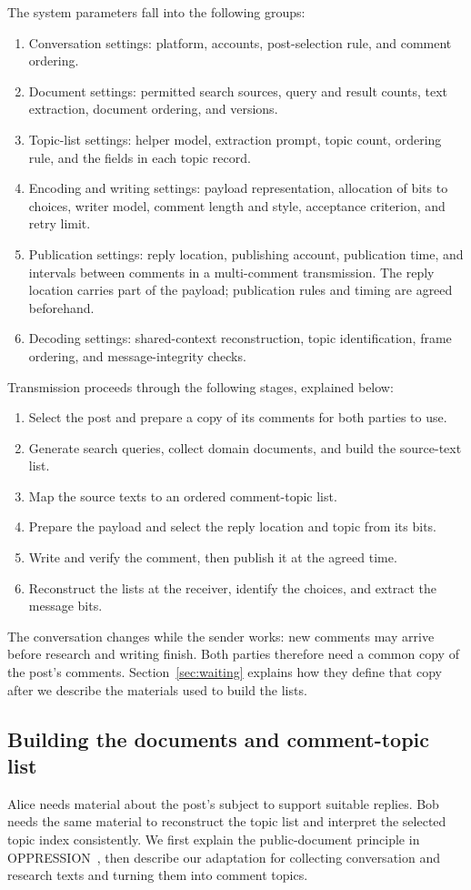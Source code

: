 The system parameters fall into the following groups:
\begin{enumerate}
\item Conversation settings: platform, accounts, post-selection rule, and comment ordering.
\item Document settings: permitted search sources, query and result counts, text extraction, document ordering, and versions.
\item Topic-list settings: helper model, extraction prompt, topic count, ordering rule, and the fields in each topic record.
\item Encoding and writing settings: payload representation, allocation of bits to choices, writer model, comment length and style, acceptance criterion, and retry limit.
\item Publication settings: reply location, publishing account, publication time, and intervals between comments in a multi-comment transmission. The reply location carries part of the payload; publication rules and timing are agreed beforehand.
\item Decoding settings: shared-context reconstruction, topic identification, frame ordering, and message-integrity checks.
\end{enumerate}

Transmission proceeds through the following stages, explained below:
\begin{enumerate}
\item Select the post and prepare a copy of its comments for both parties to use.
\item Generate search queries, collect domain documents, and build the source-text list.
\item Map the source texts to an ordered comment-topic list.
\item Prepare the payload and select the reply location and topic from its bits.
\item Write and verify the comment, then publish it at the agreed time.
\item Reconstruct the lists at the receiver, identify the choices, and extract the message bits.
\end{enumerate}
The conversation changes while the sender works: new comments may arrive before research and writing finish. Both parties therefore need a common copy of the post's comments. Section~\ref{sec:waiting} explains how they define that copy after we describe the materials used to build the lists.

\subsection{Building the documents and comment-topic list}
\label{sec:search_determinism}
Alice needs material about the post's subject to support suitable replies. Bob needs the same material to reconstruct the topic list and interpret the selected topic index consistently.
We first explain the public-document principle in OPPRESSION~\cite{zillien2024oppression}, then describe our adaptation for collecting conversation and research texts and turning them into comment topics.

